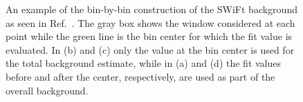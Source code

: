 \begin{figure}[]
	\centering
	\hspace{0.1\textwidth}%
	\caption{An example of the bin-by-bin construction of the SWiFt background as seen in Ref.~\cite{SWiFt}.  The gray box shows the window considered at each point while the green line is the bin center for which the fit value is evaluated.  In (b) and (c) only the value at the bin center is used for the total background estimate, while in (a) and (d) the fit values before and after the center, respectively, are used as part of the overall background.}
	\label{fig:SwiftSlide}
\end{figure}

